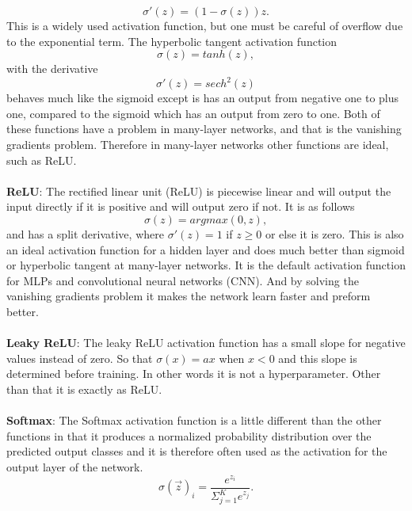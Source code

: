 \begin{equation*}
    \sigma'(z) = (1-\sigma(z))z.
\end{equation*}
This is a widely used activation function, but one must be careful of overflow
due to the exponential term. The hyperbolic tangent activation function
\begin{equation*}
    \sigma(z) = tanh(z),
\end{equation*}
with the derivative
\begin{equation*}
    \sigma'(z) = sech^2(z)
\end{equation*}
behaves much like the sigmoid except is has an output from negative one to plus
one, compared to the sigmoid which has an output from zero to one. Both of
these functions have a problem in many-layer networks, and that is the
vanishing gradients problem. Therefore in many-layer networks other functions
are ideal, such as ReLU.
\\~\\
\textbf{ReLU}:
The rectified linear unit (ReLU) is piecewise linear and will output the input
directly if it is positive and will output zero if not. It is as follows
\begin{equation*}
    \sigma(z) = argmax(0, z),
\end{equation*}
and has a split derivative, where $\sigma'(z)=1$ if $z\geq 0$ or else it is zero.
This is also an ideal activation function for a hidden layer and does much
better than sigmoid or hyperbolic tangent at many-layer networks. It is the
default activation function for MLPs and convolutional neural networks (CNN).
And by solving the vanishing gradients problem it makes the network learn
faster and preform better.
\\~\\
%
\textbf{Leaky ReLU}:
The leaky ReLU activation function has a small slope for negative values
instead of zero. So that $\sigma(x)=ax$ when $x<0$ and this slope is determined
before training. In other words it is not a hyperparameter. Other than that it
is exactly as ReLU.
\\~\\
%
\textbf{Softmax}:
The Softmax activation function is a little different than the other functions
in that it produces a normalized probability distribution over the predicted
output classes and it is therefore often used as the activation for the output
layer of the network.
\begin{equation*}
    \sigma(\vec{z})_i=\frac{e^{z_i}}{\Sigma_{j=1}^{K}e^{z_j}}.
\end{equation*}

